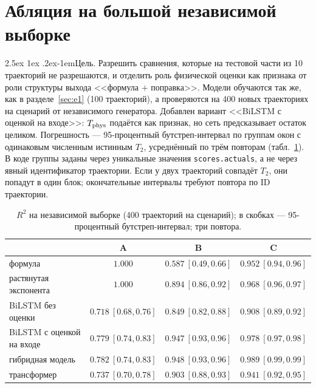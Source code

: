 \documentclass[12pt,a4paper]{report}
\makeatletter
\renewcommand\paragraph{\@startsection{paragraph}{4}{\z@}%
  {2.5ex \@plus1ex \@minus.2ex}{-1em}{\normalfont\normalsize\bfseries}}
\numberwithin{equation}{chapter}
\makeatother
\begin{document}
\section{Абляция на большой независимой выборке}
\label{sec:r13}

\paragraph{Цель.} Разрешить сравнения, которые на тестовой части из 10
траекторий не разрешаются, и отделить роль физической оценки как признака
от роли структуры выхода <<формула $+$ поправка>>. Модели обучаются так же,
как в разделе~\ref{sec:e1} (100 траекторий), а проверяются на 400 новых
траекториях на сценарий от независимого генератора. Добавлен вариант
<<BiLSTM с оценкой на входе>>: $T_{\rm phys}$ подаётся как признак, но сеть
предсказывает остаток целиком. Погрешность --- 95-процентный
бутстреп-интервал по группам окон с одинаковым численным истинным $T_2$,
усреднённый по трём повторам (табл.~\ref{tab:r13}). В коде группы заданы
через уникальные значения \texttt{scores.actuals}, а не через явный
идентификатор траектории. Если у двух траекторий совпадёт $T_2$, они попадут
в один блок; окончательные интервалы требуют повтора по ID траектории.

\begin{table}[h]
\centering
\caption{$R^2$ на независимой выборке (400 траекторий на сценарий); в
скобках --- 95-процентный бутстреп-интервал; три повтора.}
\label{tab:r13}
\small
\begin{tabular}{@{}lccc@{}}
\toprule
 & A & B & C \\
\midrule
формула & $1.000$ & $0.587\ [0.49,0.66]$ & $0.952\ [0.94,0.96]$ \\
растянутая экспонента & $1.000$ & $0.894\ [0.86,0.92]$ & $0.968\ [0.96,0.97]$ \\
BiLSTM без оценки & $0.718\ [0.68,0.76]$ & $0.849\ [0.82,0.88]$ & $0.908\ [0.89,0.92]$ \\
BiLSTM с оценкой на входе & $0.779\ [0.74,0.83]$ & $0.947\ [0.93,0.96]$ & $0.978\ [0.97,0.98]$ \\
гибридная модель & $0.782\ [0.74,0.83]$ & $\mathbf{0.948\ [0.93,0.96]}$ & $\mathbf{0.989\ [0.99,0.99]}$ \\
трансформер & $0.737\ [0.70,0.78]$ & $0.903\ [0.88,0.93]$ & $0.941\ [0.92,0.95]$ \\
\bottomrule
\end{tabular}
\end{table}
\end{document}
